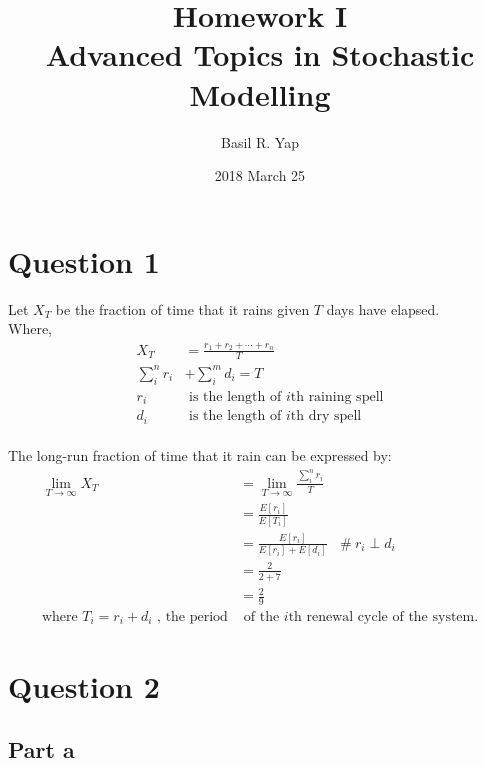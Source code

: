 \documentclass[a4paper, fleqn]{article}
\begin{document}
\title{Homework I \\ Advanced Topics in Stochastic Modelling}
\author{Basil R. Yap}
\date{2018 March 25}
\maketitle

\section{Question 1}

Let $X_T$ be the fraction of time that it rains given $T$ days have elapsed.\\
Where,
$$\begin{aligned}
X_T&=\frac{r_1+r_2+\cdots+r_n}{T}\\
\sum_i^n r_i&+\sum_i^m d_i=T\\
r_i&\text{ is the length of }i\text{th raining spell}\\
d_i&\text{ is the length of }i\text{th dry spell}
\end{aligned}$$\\
The long-run fraction of time that it rain can be expressed by:
$$
\begin{aligned}
\lim_{T\rightarrow\infty}X_T&=\lim_{T\rightarrow\infty}\frac{\sum_i^n r_i}{T}\\
&=\frac{E[r_i]}{E[T_i]}\\
&=\frac{E[r_i]}{E[r_i]+E[d_i]}\ \ \ \ \#\ r_i\perp d_i\\
&=\frac{2}{2+7}\\
&=\frac{2}{9}\\
\text{where }T_i=r_i+d_i\text{ , the period}&\text{ of the }i\text{th renewal cycle of the system.}
\end{aligned}
$$
\pagebreak
\section{Question 2}

\subsection{Part a}
\end{document}
